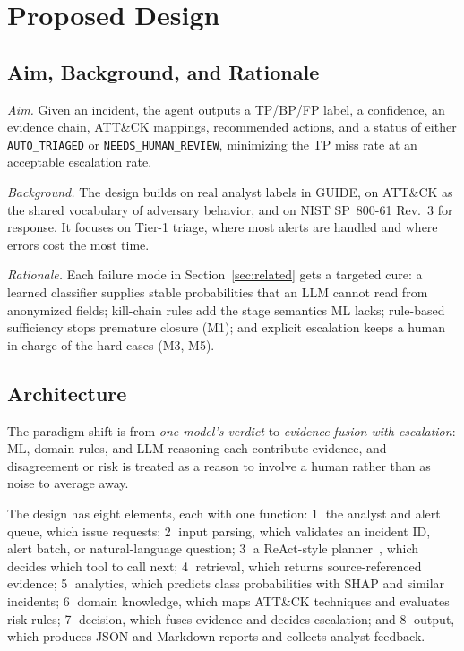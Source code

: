 \documentclass[conference]{IEEEtran}
\begin{document}
\section{Proposed Design}\label{sec:design}

\subsection{Aim, Background, and Rationale}
\emph{Aim.} Given an incident, the agent outputs a TP/BP/FP label, a
confidence, an evidence chain, ATT\&CK mappings, recommended actions,
and a status of either \texttt{AUTO\_TRIAGED} or
\texttt{NEEDS\_HUMAN\_REVIEW}, minimizing the TP miss rate at an
acceptable escalation rate.

\emph{Background.} The design builds on real analyst labels in GUIDE,
on ATT\&CK as the shared vocabulary of adversary behavior, and on
NIST SP~800-61 Rev.~3 for response. It focuses on Tier-1 triage, where
most alerts are handled and where errors cost the most time.

\emph{Rationale.} Each failure mode in Section~\ref{sec:related} gets a
targeted cure: a learned classifier supplies stable probabilities that
an LLM cannot read from anonymized fields; kill-chain rules add the
stage semantics ML lacks; rule-based sufficiency stops premature
closure (M1); and explicit escalation keeps a human in charge of the
hard cases (M3, M5).

\subsection{Architecture}
The paradigm shift is from \emph{one model's verdict} to \emph{evidence
fusion with escalation}: ML, domain rules, and LLM reasoning each
contribute evidence, and disagreement or risk is treated as a reason to
involve a human rather than as noise to average away.

The design has eight elements, each with one function:
\textcircled{1} the analyst and alert queue, which issue requests;
\textcircled{2} input parsing, which validates an incident ID, alert
batch, or natural-language question;
\textcircled{3} a ReAct-style planner~\cite{yao2023react}, which decides
which tool to call next;
\textcircled{4} retrieval, which returns source-referenced evidence;
\textcircled{5} analytics, which predicts class probabilities with SHAP
and similar incidents;
\textcircled{6} domain knowledge, which maps ATT\&CK techniques and
evaluates risk rules;
\textcircled{7} decision, which fuses evidence and decides escalation;
and \textcircled{8} output, which produces JSON and Markdown reports and
collects analyst feedback.
\end{document}
